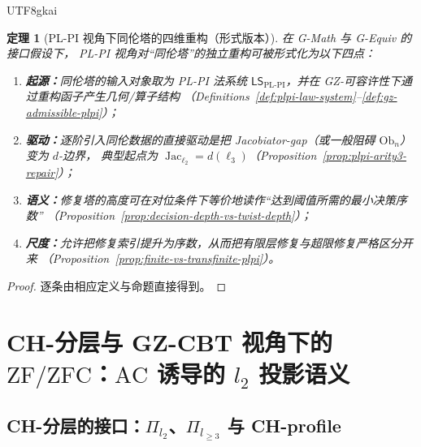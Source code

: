 \documentclass[12pt]{article}
\newtheorem{theorem}{定理}[section]
\newcommand{\Layer}{\ensuremath{\ell}}
\newcommand{\Jac}{\operatorname{Jac}}
\newcommand{\Ob}{\mathrm{Ob}}
\newcommand{\LSPLPI}{\ensuremath{\mathsf{LS}_{\mathrm{PL\text{-}PI}}}}
\newcommand{\ZF}{\ensuremath{\mathrm{ZF}}}
\newcommand{\ZFC}{\ensuremath{\mathrm{ZFC}}}
\newcommand{\AC}{\ensuremath{\mathrm{AC}}}
\begin{document}
\begin{CJK*}{UTF8}{gkai}
\begin{theorem}[PL-PI 视角下同伦塔的四维重构（形式版本）]
\label{thm:plpi-four-dimensions}
在 G-Math\cite{GaoZheng2025GFramework} 与 G-Equiv\cite{JacGapDStructureEquiv} 的接口假设下，
PL-PI 视角对“同伦塔”的独立重构可被形式化为以下四点：
\begin{enumerate}
  \item \textbf{起源：}同伦塔的输入对象取为 PL-PI 法系统 $\LSPLPI$，并在 GZ-可容许性下通过重构函子产生几何/算子结构
        （Definitions~\ref{def:plpi-law-system}--\ref{def:gz-admissible-plpi}）；
  \item \textbf{驱动：}逐阶引入同伦数据的直接驱动是把 Jacobiator-gap（或一般阻碍 $\Ob_n$）变为 $d$-边界，
        典型起点为 $\Jac_{\Layer_2}=d(\Layer_3)$（Proposition~\ref{prop:plpi-arity3-repair}）；
  \item \textbf{语义：}修复塔的高度可在对位条件下等价地读作“达到阈值所需的最小决策序数”
        （Proposition~\ref{prop:decision-depth-vs-twist-depth}）；
  \item \textbf{尺度：}允许把修复索引提升为序数，从而把有限层修复与超限修复严格区分开来
        （Proposition~\ref{prop:finite-vs-transfinite-plpi}）。
\end{enumerate}
\end{theorem}

\begin{proof}
逐条由相应定义与命题直接得到。
\end{proof}

\section{CH-分层与 GZ-CBT 视角下的 $\ZF/\ZFC$：$\AC$ 诱导的 $l_2$ 投影语义}
\label{sec:zf-zfc-chlayer}

\subsection{CH-分层的接口：$\Pi_{l_2}$、$\Pi_{l_{\ge 3}}$ 与 CH-profile}


\end{CJK*}
\end{document}
